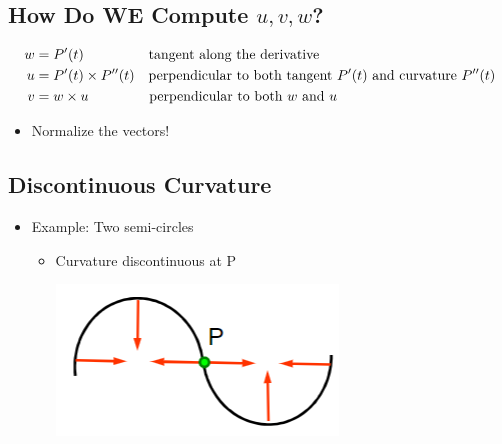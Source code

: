 \documentclass{article}
\begin{document}
\subsection*{How Do WE Compute $u, v, w$?}
\begin{align*}
    w &= P'(t)                             &\text{tangent along the derivative}\hspace{4.45cm}\\
    u &= P'(t) \times P''(t)               &\text{perpendicular to both tangent }P'(t) \text{ and curvature } P''(t)\\
    v &= w \times u                        &\text{perpendicular to both }w \text{ and }u\hspace{4cm}
\end{align*}
\begin{itemize}
    \item Normalize the vectors!
\end{itemize}

\subsection*{Discontinuous Curvature}
\begin{itemize}
    \item Example: Two semi-circles
    \begin{itemize}
        \item Curvature discontinuous at P
        \begin{center}
            \includegraphics*[scale=0.7]{W4_12.png}
        \end{center}
    \end{itemize}
\end{itemize}
\end{document}
